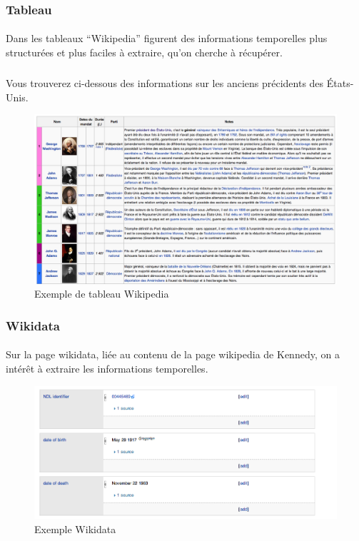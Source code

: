 \subsubsection*{Tableau}
\paragraph{}
Dans les tableaux “Wikipedia” figurent des informations temporelles plus structurées et plus faciles à extraire, qu’on cherche à récupérer.
\subparagraph{}
Vous trouverez ci-dessous des informations sur les anciens précidents des États-Unis.
\begin{figure}[H]
        \centering
                \centering
                \includegraphics[width=14cm]{tableau.png}
               \caption{Exemple de tableau Wikipedia}

\end{figure}
\subsubsection*{Wikidata}
\paragraph{}
Sur la page wikidata, liée au contenu de la page wikipedia de Kennedy, on a intérêt à extraire les informations temporelles.
\begin{figure}[H]
        \centering
                \centering
                \includegraphics[width=14cm]{wikidata.png}
               \caption{Exemple Wikidata}

\end{figure}
